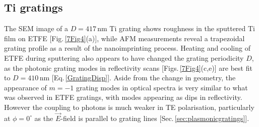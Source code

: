 \subsection{Ti gratings}
The SEM image of a $D=417$\,nm Ti grating shows roughness in the sputtered Ti film on ETFE [Fig.\,\ref{7Fig4}(a)], while AFM measurements reveal a trapezoidal grating profile as a result of the nanoimprinting process. Heating and cooling of ETFE during sputtering also appears to have changed the grating periodicity $D$, as the photonic grating modes in reflectivity scans [Figs.\,\ref{7Fig4}(c,e)] are best fit to $D=410$\,nm [Eq.\,\ref{GratingDisp}]. Aside from the change in geometry, the appearance of $m=-1$ grating modes in optical spectra is very similar to what was observed in ETFE gratings, with modes appearing as dips in reflectivity. However the coupling to photons is much weaker in TE polarisation, particularly at $\phi=0^{\circ}$ as the $\vec{E}$-field is parallel to grating lines [Sec.\,\ref{sec:plasmonicgratings}].



